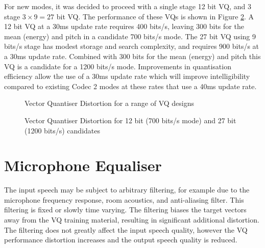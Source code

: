 \documentclass{article}
\begin{document}
For new modes, it was decided to proceed with a single stage 12 bit VQ, and 3 stage $3 \times 9 = 27$ bit VQ.  The performance of these VQs is shown in Figure \ref{fig:train_ratek1}.  A 12 bit VQ at a 30ms update rate requires 400 bits/s, leaving 300 bits for the mean (energy) and pitch in a candidate 700 bits/s mode.  The 27 bit VQ using 9 bits/s stage has modest storage and search complexity, and requires 900 bits/s at a 30ms update rate. Combined with 300 bits for the mean (energy) and pitch this VQ is a candidate for a 1200 bits/s mode. Improvements in quantisation efficiency allow the use of a 30ms update rate which will improve intelligibility compared to existing Codec 2 modes at these rates that use a 40ms update rate.

\begin{figure}[h]
\caption{Vector Quantiser Distortion for a range of VQ designs}
\label{fig:train_ratek}
\begin{center}

\end{center}
\end{figure}

\begin{figure}[h]
\caption{Vector Quantiser Distortion for 12 bit (700 bits/s mode) and 27 bit (1200 bits/s) candidates}
\label{fig:train_ratek1}
\begin{center}

\end{center}
\end{figure}

\section{Microphone Equaliser}

The input speech may be subject to arbitrary filtering, for example due to the microphone frequency response, room acoustics, and anti-aliasing filter.  This filtering is fixed or slowly time varying.  The filtering biases the target vectors away from the VQ training material, resulting in significant additional distortion.  The filtering does not greatly affect the input speech quality, however the VQ performance distortion increases and the output speech quality is reduced.
\end{document}
